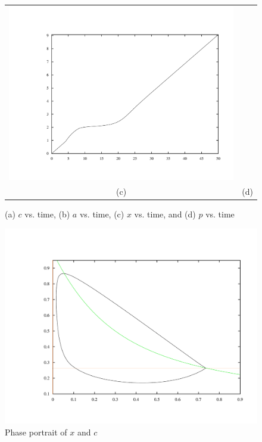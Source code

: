 \documentclass{article}
\begin{document}
\begin{figure}
\begin{tabular}{cc}
    \includegraphics[scale = 0.23, angle = 0]{biprodTime.pdf}\\
    (c) & (d)
  \end{tabular}
  \caption{(a) $c$ vs. time, (b) $a$ vs. time, (c) $x$ vs. time, and (d) $p$ vs. time}
  \label{eqsVsTime}
\end{figure}



\begin{figure}
  \centering
  \includegraphics[scale = 0.35]{carbonBact.pdf}
  \caption{Phase portrait of $x$ and $c$}
  \label{phase:xc}
\end{figure}
\end{document}

